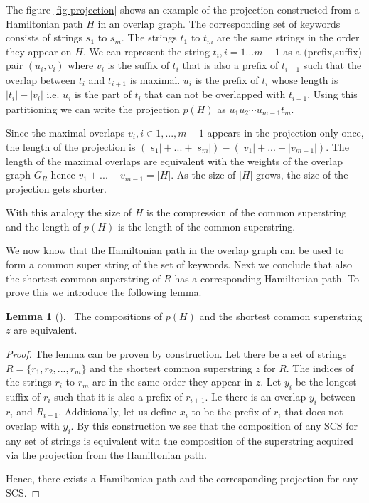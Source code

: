 \documentclass[english,twoside,censored,csm,algorithms-track-2020]{HYthesisML}
\theoremstyle{plain}
\theoremstyle{definition}
\newtheorem{lemma}[theorem]{Lemma}
\begin{document}

The figure \ref{fig-projection} shows an example of the projection constructed from a
Hamiltonian path $H$ in an overlap graph. The corresponding set of keywords consists of
strings $s_1$ to $s_m$. The strings $t_1$ to $t_m$ are the same strings in the order they appear on $H$.
We can represent the string $t_i, i=1...m-1$ as a (prefix,suffix) pair
$(u_i,v_i)$ where $v_i$ is the suffix of $t_i$ that is also a prefix of $t_{i+1}$ such that the
overlap between $t_i$ and $t_{i+1}$ is maximal. $u_i$ is the prefix of $t_i$ whose length is $|t_i|-|v_i|$
i.e. $u_i$ is the part of $t_i$ that can not be overlapped with $t_{i+1}$. Using this partitioning we can
write the projection $p(H)$ as $u_1u_2\cdots u_{m-1}t_m$.

Since the maximal overlaps $v_i,i\in1,...,m-1$ appears in the projection only once, the length of the
projection is $(|s_1|+...+|s_m|) - (|v_1|+...+|v_{m-1}|)$. The length of the maximal overlaps
are equivalent
with the weights of the overlap graph $G_R$ hence $v_1+...+v_{m-1} = |H|$. As the size of $|H|$ grows, the size
of the projection gets shorter.


With this analogy the size of $H$ is the compression of the common superstring
and the length of $p(H)$ is the length of the common superstring.

We now know that the Hamiltonian path in the overlap graph can be used to form a common super string
of the set of keywords. Next we conclude that also the shortest common superstring of $R$ has a
corresponding Hamiltonian path. To prove this we introduce the following lemma.


\begin{lemma}[]~\label{lem-composition}
The compositions of $p(H)$ and the shortest common superstring $z$ are equivalent.
\end{lemma}
\begin{proof}
  The lemma can be proven by construction. Let there be a set of strings $R=\{r_1,r_2,...,r_m\}$ and
  the shortest common superstring $z$ for $R$. The indices of the strings $r_i$ to $r_m$ are in the same
  order they appear in $z$. Let $y_i$ be the longest suffix of $r_i$ such that it is also a prefix
  of $r_{i+1}$. I.e there is an overlap $y_i$ between $r_i$ and $R_{i+1}$. Additionally, let us
  define $x_i$ to be the prefix of $r_i$ that does not overlap with $y_i$. By this construction we
  see that the composition of any SCS for any set of strings is equivalent with the composition
  of the superstring acquired via the projection from the Hamiltonian path.

  Hence, there exists a
  Hamiltonian path and the corresponding projection for any SCS.
\end{proof}
\end{document}
